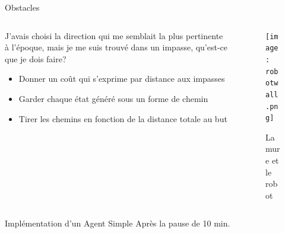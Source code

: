 \documentclass{beamer}
\begin{document}
\begin{frame}{Obstacles}
  \begin{columns}
    \begin{column}{0.6\textwidth}
      \begin{block}{}

        J'avais choisi la direction qui me semblait la plus pertinente à
        l'époque, mais je me suis trouvé dans un impasse, qu'est-ce que je dois faire?
        \begin{itemize}
        \item Donner un coût qui s'exprime par distance aux impasses
        \item Garder chaque état généré sous un forme de chemin
        \item Tirer les chemins en fonction de la distance totale au but
        \end{itemize}

      \end{block}
    \end{column}
    \begin{column}{0.4\textwidth}
      \begin{block}{}
        \begin{figure}
          \centering
          \texttt{[image: robotwall.png]}
          \caption{La mure et le robot}
          \label{fig:robowall}
        \end{figure}
      \end{block}
    \end{column}
  \end{columns}
\end{frame}

\begin{frame}{Implémentation d'un Agent Simple}
Après la pause de 10 min.
\end{frame}
\end{document}

